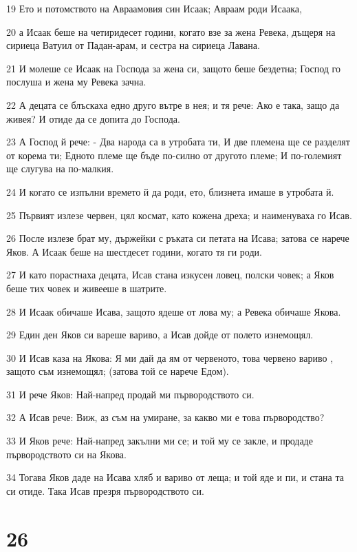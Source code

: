 \par 19 Ето и потомството на Авраамовия син Исаак; Авраам роди Исаака,
\par 20 а Исаак беше на четиридесет години, когато взе за жена Ревека, дъщеря на сириеца Ватуил от Падан-арам, и сестра на сириеца Лавана.
\par 21 И молеше се Исаак на Господа за жена си, защото беше бездетна; Господ го послуша и жена му Ревека зачна.
\par 22 А децата се блъскаха едно друго вътре в нея; и тя рече: Ако е така, защо да живея? И отиде да се допита до Господа.
\par 23 А Господ й рече: - Два народа са в утробата ти, И две племена ще се разделят от корема ти; Едното племе ще бъде по-силно от другото племе; И по-големият ще слугува на по-малкия.
\par 24 И когато се изпълни времето й да роди, ето, близнета имаше в утробата й.
\par 25 Първият излезе червен, цял космат, като кожена дреха; и наименуваха го Исав.
\par 26 После излезе брат му, държейки с ръката си петата на Исава; затова се нарече Яков. А Исаак беше на шестдесет години, когато тя ги роди.
\par 27 И като порастнаха децата, Исав стана изкусен ловец, полски човек; а Яков беше тих човек и живееше в шатрите.
\par 28 И Исаак обичаше Исава, защото ядеше от лова му; а Ревека обичаше Якова.
\par 29 Един ден Яков си вареше вариво, а Исав дойде от полето изнемощял.
\par 30 И Исав каза на Якова: Я ми дай да ям от червеното, това червено вариво , защото съм изнемощял; (затова той се нарече Едом).
\par 31 И рече Яков: Най-напред продай ми първородството си.
\par 32 А Исав рече: Виж, аз съм на умиране, за какво ми е това първородство?
\par 33 И Яков рече: Най-напред закълни ми се; и той му се закле, и продаде първородството си на Якова.
\par 34 Тогава Яков даде на Исава хляб и вариво от леща; и той яде и пи, и стана та си отиде. Така Исав презря първородството си.

\chapter{26}

